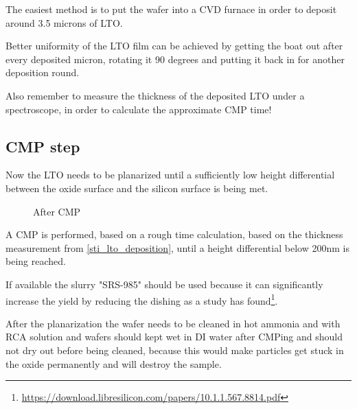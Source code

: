 The easiest method is to put the wafer into a CVD furnace in order to deposit around 3.5 microns of LTO.

Better uniformity of the LTO film can be achieved by getting the boat out after every deposited micron, rotating it 90 degrees and putting it back in for another deposition round.

Also remember to measure the thickness of the deposited LTO under a spectroscope, in order to calculate the approximate CMP time!

\newpage

\subsection{CMP step}\label{sti_cmp_step}

Now the LTO needs to be planarized until a sufficiently low height differential between the oxide surface and the silicon surface is being met.

\begin{figure}[H]
	\centering
	\begin{tikzpicture}[node distance = 3cm, auto, thick,scale=\CrossSectionOnly, every node/.style={transform shape}]
		
	\end{tikzpicture}
	\begin{tikzpicture}[node distance = 3cm, auto, thick,scale=\CrossSectionOnly, every node/.style={transform shape}]
		
	\end{tikzpicture}
	\begin{tikzpicture}[node distance = 3cm, auto, thick,scale=\CrossSectionOnly, every node/.style={transform shape}]
		
	\end{tikzpicture}
	\caption{After CMP}
\end{figure}

A CMP is performed, based on a rough time calculation, based on the thickness measurement from \autoref{sti_lto_deposition}, until a height differential below 200nm is being reached.

If available the slurry "SRS-985" should be used because it can significantly increase the yield by reducing the dishing as a study has found\footnote{\url{https://download.libresilicon.com/papers/10.1.1.567.8814.pdf}}.

After the planarization the wafer needs to be cleaned in hot ammonia and with RCA solution and wafers should kept wet in DI water after CMPing and should not dry out before being cleaned, because this would make particles
get stuck in the oxide permanently and will destroy the sample.

